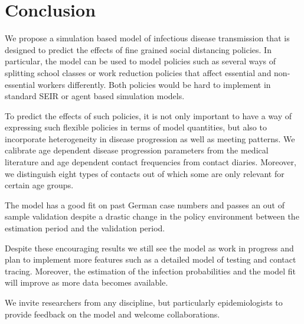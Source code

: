 \section{Conclusion}
\label{sec:conclusion}

We propose a simulation based model of infectious disease transmission that is designed to predict the effects of fine grained social distancing policies. In particular, the model can be used to model policies such as several ways of splitting school classes or work reduction policies that affect essential and non-essential workers differently. Both policies would be hard to implement in standard SEIR or agent based simulation models.

To predict the effects of such policies, it is not only important to have a way of expressing such flexible policies in terms of model quantities, but also to incorporate heterogeneity in disease progression as well as meeting patterns. We calibrate age dependent disease progression parameters from the medical literature and age dependent contact frequencies from contact diaries. Moreover, we distinguish eight types of contacts out of which some are only relevant for certain age groups.

The model has a good fit on past German case numbers and passes an out of sample validation despite a drastic change in the policy environment between the estimation period and the validation period.

Despite these encouraging results we still see the model as work in progress and plan to implement more features such as a detailed model of testing and contact tracing. Moreover, the estimation of the infection probabilities and the model fit will improve as more data becomes available.

We invite researchers from any discipline, but particularly epidemiologists to provide feedback on the model and welcome collaborations.
